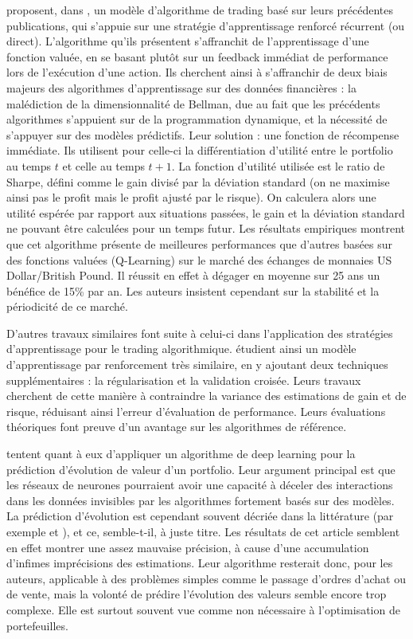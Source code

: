 \documentclass[a4paper, 10pt]{article}
\begin{document}
\textbf{\citet{Moody2001}} proposent, dans \textbf{}, un modèle d'algorithme de trading basé sur leurs précédentes publications, qui s'appuie sur une stratégie d'apprentissage renforcé récurrent (ou direct). L'algorithme qu'ils présentent s'affranchit de l'apprentissage d'une fonction valuée, en se basant plutôt sur un feedback immédiat de performance lors de l'exécution d'une action. Ils cherchent ainsi à s'affranchir de deux biais majeurs des algorithmes d'apprentissage sur des données financières : la malédiction de la dimensionnalité de Bellman, due au fait que les précédents algorithmes s'appuient sur de la programmation dynamique, et la nécessité de s'appuyer sur des modèles prédictifs. Leur solution : une fonction de récompense immédiate. Ils utilisent pour celle-ci la différentiation d'utilité entre le portfolio au temps $t$ et celle au temps $t+1$. La fonction d'utilité utilisée est le ratio de Sharpe, défini comme le gain divisé par la déviation standard (on ne maximise ainsi pas le profit mais le profit ajusté par le risque). On calculera alors une utilité espérée par rapport aux situations passées,  le gain et la déviation standard ne pouvant être calculées pour un temps futur. Les résultats empiriques montrent que cet algorithme présente de meilleures performances que d'autres basées sur des fonctions valuées (Q-Learning) sur le marché des échanges de monnaies US Dollar/British Pound. Il réussit en effet à dégager en moyenne sur 25 ans un bénéfice de 15\% par an. Les auteurs insistent cependant sur la stabilité et la périodicité de ce marché.

D'autres travaux similaires font suite à celui-ci dans l'application des stratégies d'apprentissage pour le trading algorithmique. \textbf{\citet{Ban2016}} étudient ainsi un modèle d'apprentissage par renforcement très similaire, en y ajoutant deux techniques supplémentaires : la régularisation et la validation croisée. Leurs travaux cherchent de cette manière à contraindre la variance des estimations de gain et de risque, réduisant ainsi l'erreur d'évaluation de performance. Leurs évaluations théoriques font preuve d’un avantage sur les algorithmes de référence.

\textbf{\citet{Heaton2017}} tentent quant à eux d'appliquer un algorithme de deep learning pour la prédiction d'évolution de valeur d'un portfolio. Leur argument principal est que les réseaux de neurones pourraient avoir une capacité à déceler des interactions dans les données invisibles par les algorithmes fortement basés sur des modèles. La prédiction d'évolution est cependant souvent décriée dans la littérature (par exemple \cite{Moody2001} et \cite{Jiang2017}), et ce, semble-t-il, à juste titre. Les résultats de cet article semblent en effet montrer une assez mauvaise précision, à cause d'une accumulation d'infimes imprécisions des estimations. Leur algorithme resterait donc, pour les auteurs, applicable à des problèmes simples comme le passage d'ordres d'achat ou de vente, mais la volonté de prédire l'évolution des valeurs semble encore trop complexe. Elle est surtout souvent vue comme non nécessaire à l'optimisation de portefeuilles.
\end{document}
